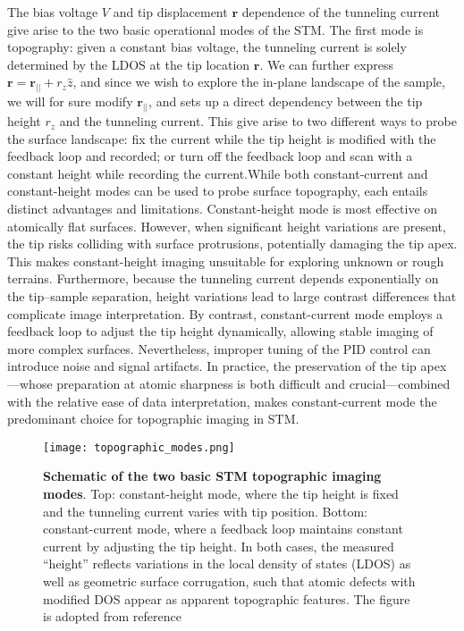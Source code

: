 \noindent The bias voltage $V$ and tip displacement $\mathbf{r}$ dependence of the tunneling current give arise to the two basic operational modes of the \ac{STM}. The first mode is topography: given a constant bias voltage, the tunneling current is solely determined by the \ac{LDOS} at the tip location $\mathbf{r}$. We can further express $\mathbf{r} = \mathbf{r_{||}} + r_z \hat{z}$, and since we wish to explore the in-plane landscape of the sample, we will for sure modify $\mathbf{r_{||}}$, and sets up a direct dependency between the tip height $r_z$ and the tunneling current. This give arise to two different ways to probe the surface landscape: fix the current while the tip height is modified with the feedback loop and recorded; or turn off the feedback loop and scan with a constant height while recording the current.While both constant-current and constant-height modes can be used to probe surface topography, each entails distinct advantages and limitations. Constant-height mode is most effective on atomically flat surfaces. However, when significant height variations are present, the tip risks colliding with surface protrusions, potentially damaging the tip apex. This makes constant-height imaging unsuitable for exploring unknown or rough terrains. Furthermore, because the tunneling current depends exponentially on the tip–sample separation, height variations lead to large contrast differences that complicate image interpretation. By contrast, constant-current mode employs a feedback loop to adjust the tip height dynamically, allowing stable imaging of more complex surfaces. Nevertheless, improper tuning of the PID control can introduce noise and signal artifacts. In practice, the preservation of the tip apex—whose preparation at atomic sharpness is both difficult and crucial—combined with the relative ease of data interpretation, makes constant-current mode the predominant choice for topographic imaging in STM. 

\begin{figure}
	\centering
	\texttt{[image: topographic\_modes.png]}
	\caption[\textbf{Schematic of the two basic STM topographic imaging modes}]{\textbf{Schematic of the two basic STM topographic imaging modes}. Top: constant-height mode, where the tip height is fixed and the tunneling current varies with tip position. Bottom: constant-current mode, where a feedback loop maintains constant current by adjusting the tip height. In both cases, the measured “height” reflects variations in the local density of states (LDOS) as well as geometric surface corrugation, such that atomic defects with modified DOS appear as apparent topographic features. The figure is adopted from reference \cite{stuartScanningTunnellingMicroscopy2021}}
	\label{fig:topo_modes}
\end{figure}

